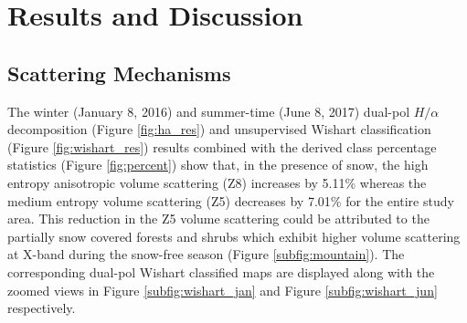\documentclass[review]{elsarticle}
\numberwithin{equation}{section}
\numberwithin{figure}{section}
\numberwithin{table}{section}
\begin{document}
\section{Results and Discussion}
\label{sec:res}
\subsection{Scattering Mechanisms}
\label{ssec:scat}

The winter (January 8, 2016) and summer-time (June 8, 2017) dual-pol $H/{\alpha}$ decomposition (Figure \ref{fig:ha_res}) and unsupervised Wishart classification (Figure \ref{fig:wishart_res}) results combined with the derived class percentage statistics (Figure \ref{fig:percent}) show that, in the presence of snow, the high entropy anisotropic volume scattering (Z8) increases by 5.11\% whereas the medium entropy volume scattering (Z5) decreases by 7.01\% for the entire study area. This reduction in the Z5 volume scattering could be attributed to the partially snow covered forests and shrubs which exhibit higher volume scattering at X-band during the snow-free season (Figure \ref{subfig:mountain}). The corresponding dual-pol Wishart classified maps are displayed along with the zoomed views in Figure \ref{subfig:wishart_jan} and Figure \ref{subfig:wishart_jun} respectively.
\end{document}
